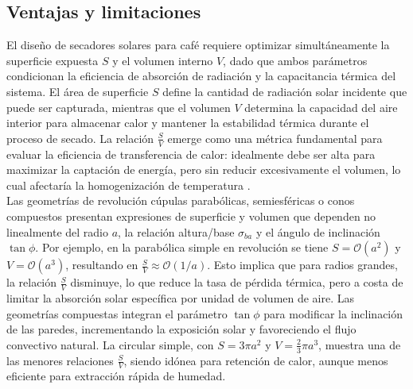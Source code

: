 \documentclass[12pt]{article}
\begin{document}
\clearpage




\subsection{Ventajas y limitaciones}
\label{subsec:ventajas_y_limitaciones}

El diseño de secadores solares para café requiere optimizar simultáneamente la superficie expuesta $S$ y el volumen interno $V$, dado que ambos parámetros condicionan la eficiencia de absorción de radiación y la capacitancia térmica del sistema. El área de superficie $S$ define la cantidad de radiación solar incidente que puede ser capturada, mientras que el volumen $V$ determina la capacidad del aire interior para almacenar calor y mantener la estabilidad térmica durante el proceso de secado. La relación $\frac{S}{V}$ emerge como una métrica fundamental para evaluar la eficiencia de transferencia de calor: idealmente debe ser alta para maximizar la captación de energía, pero sin reducir excesivamente el volumen, lo cual afectaría la homogenización de temperatura \cite{belessiotis2011solar}\cite{bradford2018drychain}
.\\

Las geometrías de revolución cúpulas parabólicas, semiesféricas o conos compuestos presentan expresiones de superficie y volumen que dependen no linealmente del radio $a$, la relación altura/base $\sigma_{ba}$ y el ángulo de inclinación $\tan\phi$. Por ejemplo, en la parabólica simple en revolución se tiene $S = \mathcal{O}(a^2)$ y $V = \mathcal{O}(a^3)$, resultando en $\frac{S}{V} \approx \mathcal{O}(1/a)$. Esto implica que para radios grandes, la relación $\frac{S}{V}$ disminuye, lo que reduce la tasa de pérdida térmica, pero a costa de limitar la absorción solar específica por unidad de volumen de aire. Las geometrías compuestas integran el parámetro $\tan\phi$ para modificar la inclinación de las paredes, incrementando la exposición solar y favoreciendo el flujo convectivo natural. La circular simple, con $S = 3\pi a^2$ y $V = \frac{2}{3}\pi a^3$, muestra una de las menores relaciones $\frac{S}{V}$, siendo idónea para retención de calor, aunque menos eficiente para extracción rápida de humedad.\\
\end{document}
